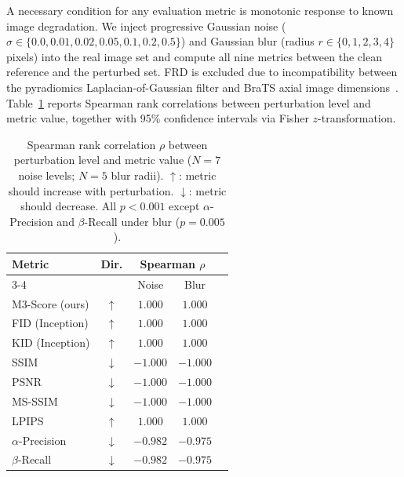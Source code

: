 \documentclass[lettersize,journal]{IEEEtran}
\begin{document}
A necessary condition for any evaluation metric is monotonic response to
known image degradation.
We inject progressive Gaussian noise
($\sigma \in \{0.0, 0.01, 0.02, 0.05, 0.1, 0.2, 0.5\}$) and Gaussian
blur (radius $r \in \{0, 1, 2, 3, 4\}$ pixels) into the real image set
and compute all nine metrics between the clean reference and the
perturbed set.
FRD is excluded due to incompatibility between the pyradiomics
Laplacian-of-Gaussian filter and BraTS axial image
dimensions~\cite{konz2025frd}.
Table~\ref{tab:noise_spearman} reports Spearman rank correlations
between perturbation level and metric value, together with 95\%
confidence intervals via Fisher $z$-transformation.

\begin{table}[t]
\centering
\caption{%
  Spearman rank correlation $\rho$ between perturbation level and
  metric value ($N = 7$ noise levels; $N = 5$ blur radii).
  $\uparrow$: metric should increase with perturbation.
  $\downarrow$: metric should decrease.
  All $p < 0.001$ except $\alpha$-Precision and $\beta$-Recall
  under blur ($p = 0.005$).
}
\label{tab:noise_spearman}
\setlength{\tabcolsep}{6pt}
\begin{tabular}{lcccc}
\toprule
\multirow{2}{*}{Metric} &
\multirow{2}{*}{Dir.} &
\multicolumn{2}{c}{Spearman $\rho$} \\
\cmidrule(lr){3-4}
& & Noise & Blur \\
\midrule
M3-Score (ours)       & $\uparrow$   & $\mathbf{1.000}$ & $\mathbf{1.000}$ \\
FID (Inception)       & $\uparrow$   & $1.000$          & $1.000$ \\
KID (Inception)       & $\uparrow$   & $1.000$          & $1.000$ \\
SSIM                  & $\downarrow$ & $-1.000$         & $-1.000$ \\
PSNR                  & $\downarrow$ & $-1.000$         & $-1.000$ \\
MS-SSIM               & $\downarrow$ & $-1.000$         & $-1.000$ \\
LPIPS                 & $\uparrow$   & $1.000$          & $1.000$ \\
$\alpha$-Precision    & $\downarrow$ & $-0.982$         & $-0.975$ \\
$\beta$-Recall        & $\downarrow$ & $-0.982$         & $-0.975$ \\
\bottomrule
\end{tabular}
\end{table}
\end{document}
